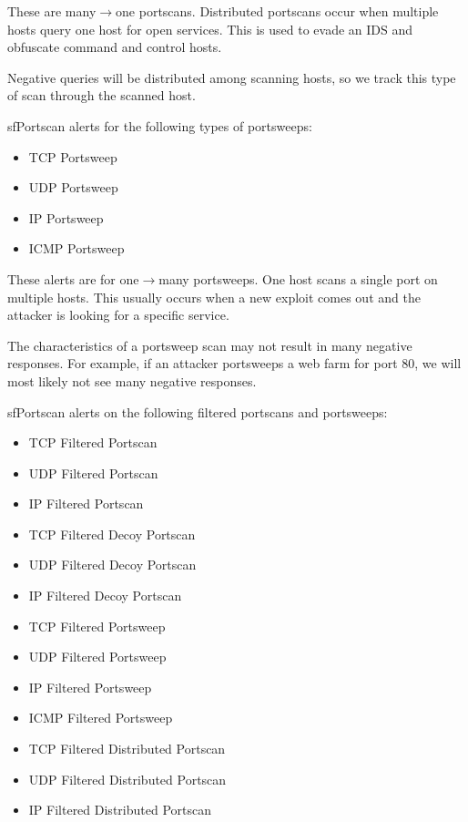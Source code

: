 \documentclass[english]{report}
\newenvironment{note}{
\samepage
    \vspace{10pt}{\textsf{
        {\hspace{7pt}\Huge{$\triangle$\hspace{-12.5pt}{\Large{$^!$}}}}\hspace{5pt}
        {\Large{NOTE}}
    }
    }
   \begin{center}
    \par\vspace{-17pt}

    \begin{lrbox}{\savepar}
    \begin{minipage}[r]{6in}
}
{
    \end{minipage}
    \end{lrbox}
    \fbox{
        \usebox{
            \savepar
	}
    }
    \par\vskip10pt
    \end{center}
}
\newenvironment{note}{
        \begin{rawhtml}
        <p><table border="1"><tr><td><b>
        Note:&nbsp;&nbsp;</b>
        \end{rawhtml}
}{
        \begin{rawhtml}
        </b></td></tr></table></p>
        \end{rawhtml}
}
\begin{document}
These are many$\rightarrow$one portscans. Distributed portscans occur when
multiple hosts query one host for open services. This is used to evade
an IDS and obfuscate command and control hosts.

\begin{note}
Negative queries will be distributed among scanning hosts, so
we track this type of scan through the scanned host.
\end{note}

sfPortscan alerts for the following types of portsweeps:
\begin{itemize}
\item TCP Portsweep
\item UDP Portsweep
\item IP Portsweep
\item ICMP Portsweep
\end{itemize}

These alerts are for one$\rightarrow$many portsweeps. One host scans a single port
on multiple hosts. This usually occurs when a new exploit comes out and the
attacker is looking for a specific service. 

\begin{note}
The characteristics of a portsweep scan may not result in many
negative responses. For example, if an attacker portsweeps a web farm
for port 80, we will most likely not see many negative responses.
\end{note}

sfPortscan alerts on the following filtered portscans and portsweeps:

\begin{itemize}
\item TCP Filtered Portscan
\item UDP Filtered Portscan
\item IP Filtered Portscan

\item TCP Filtered Decoy Portscan
\item UDP Filtered Decoy Portscan
\item IP Filtered Decoy Portscan

\item TCP Filtered Portsweep
\item UDP Filtered Portsweep
\item IP Filtered Portsweep
\item ICMP Filtered Portsweep

\item TCP Filtered Distributed Portscan
\item UDP Filtered Distributed Portscan
\item IP Filtered Distributed Portscan
\end{itemize}
\end{document}
